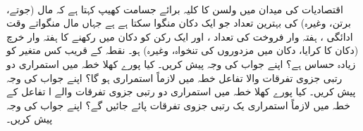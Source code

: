 \\
اقتصادیات کی میدان میں ولسن کا کلیہ برائے جسامت کھیپ  کہتا ہے کہ   مال   (جوتے، برتن، وغیرہ)  کی بہترین  تعداد     جو ایک دکان  منگوا  سکتا ہے   ہے  جہاں  مال منگواتے وقت ادائگی   ، ہفتہ وار فروخت کی تعداد  ،  اور ایک رکن  کو دکان میں رکھنے کا ہفتہ وار خرچ (دکان کا کرایا، دکان میں مزدوروں کی تنخواہ، وغیرہ)  ہو۔ نقطہ   کے قریب  کس متغیر کو زیادہ حساس ہے؟ اپنے جواب کی وجہ پیش کریں۔
کیا پورے  کھلا خطہ  میں استمراری دو رتبی جزوی تفرقات والا   تفاعل  خطہ  میں لازماً استمراری ہو گا؟ اپنے جواب کی وجہ پیش کریں۔
کیا پورے کھلا خطہ  میں استمراری دو رتبی جزوی تفرقات والے ا   تفاعل کے  خطہ  میں لازماً استمراری یک رتبی جزوی تفرقات پائے جائیں گے؟ اپنے جواب کی وجہ پیش کریں۔


